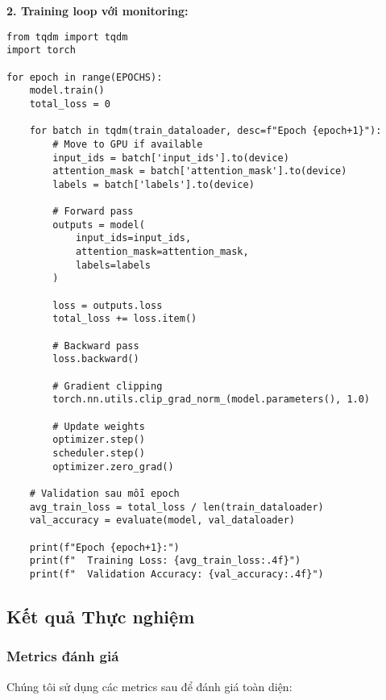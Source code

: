 \textbf{2. Training loop với monitoring:}
\begin{verbatim}
from tqdm import tqdm
import torch

for epoch in range(EPOCHS):
    model.train()
    total_loss = 0
    
    for batch in tqdm(train_dataloader, desc=f"Epoch {epoch+1}"):
        # Move to GPU if available
        input_ids = batch['input_ids'].to(device)
        attention_mask = batch['attention_mask'].to(device)
        labels = batch['labels'].to(device)
        
        # Forward pass
        outputs = model(
            input_ids=input_ids,
            attention_mask=attention_mask,
            labels=labels
        )
        
        loss = outputs.loss
        total_loss += loss.item()
        
        # Backward pass
        loss.backward()
        
        # Gradient clipping
        torch.nn.utils.clip_grad_norm_(model.parameters(), 1.0)
        
        # Update weights
        optimizer.step()
        scheduler.step()
        optimizer.zero_grad()
    
    # Validation sau mỗi epoch
    avg_train_loss = total_loss / len(train_dataloader)
    val_accuracy = evaluate(model, val_dataloader)
    
    print(f"Epoch {epoch+1}:")
    print(f"  Training Loss: {avg_train_loss:.4f}")
    print(f"  Validation Accuracy: {val_accuracy:.4f}")
\end{verbatim}

\subsection{Kết quả Thực nghiệm}
\label{ssec:danh_gia_ket_qua_sa}

\subsubsection{Metrics đánh giá}
Chúng tôi sử dụng các metrics sau để đánh giá toàn diện:

